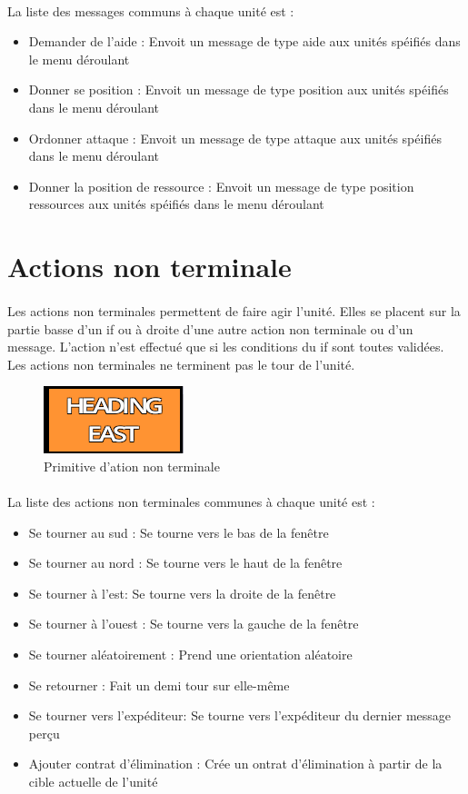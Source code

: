 \documentclass{report}
\begin{document}
\paragraph{}
La liste des messages communs à chaque unité est :
\begin{itemize}
\item Demander de l'aide : Envoit un message de type aide aux unités spéifiés dans le menu déroulant
\item Donner se position : Envoit un message de type position aux unités spéifiés dans le menu déroulant
\item Ordonner attaque : Envoit un message de type attaque aux unités spéifiés dans le menu déroulant
\item Donner la position de ressource : Envoit un message de type position ressources aux unités spéifiés dans le menu déroulant
\end{itemize}
\newpage
\section{Actions non terminale}
\paragraph{}
Les actions non terminales permettent de faire agir l'unité. Elles se placent sur la partie basse d'un if ou à droite d'une autre action non terminale ou d'un message. L'action n'est effectué que si les conditions du if sont toutes validées. Les actions non terminales ne terminent pas le tour de l'unité.
\begin{figure}[!h]
	\centering
		\includegraphics[scale=1]{action2.png}
	\caption{Primitive d'ation non terminale}
\end{figure}
\paragraph{}
La liste des actions non terminales communes à chaque unité est :
\begin{itemize}
\item Se tourner au sud : Se tourne vers le bas de la fenêtre
\item Se tourner au nord : Se tourne vers le haut de la fenêtre
\item Se tourner à l'est: Se tourne vers la droite de la fenêtre
\item Se tourner à l'ouest : Se tourne vers la gauche de la fenêtre
\item Se tourner aléatoirement : Prend une orientation aléatoire
\item Se retourner : Fait un demi tour sur elle-même
\item Se tourner vers l'expéditeur: Se tourne vers l'expéditeur du dernier message perçu
\item Ajouter contrat d'élimination : Crée un ontrat d'élimination à partir de la cible actuelle de l'unité
\end{itemize}
\end{document}
